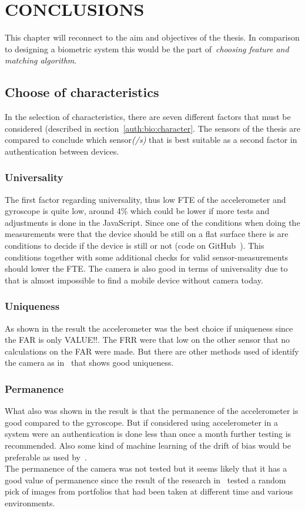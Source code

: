 \chapter{CONCLUSIONS}\label{cha:conculsions}
This chapter will reconnect to the aim and objectives of the thesis. In comparison to designing a biometric system this would be the part of~\textit{choosing feature and matching algorithm}.

\section{Choose of characteristics}\label{sec:concl:choose}
In the selection of characteristics, there are seven different factors that must be considered (described in section~\ref{auth:bio:character}. The sensors of the thesis are compared to conclude which sensor\textit{(/s)} that is best suitable as a second factor in authentication between devices.

\subsection*{Universality}
The first factor regarding universality, thus low FTE of the accelerometer and gyroscope is quite low, around 4\% which could be lower if more tests and adjustments is done in the JavaScript. Since one of the conditions when doing the measurements were that the device should be still on a flat surface there is are conditions to decide if the device is still or not (code on GitHub~\cite[]{sensorrec}). This conditions together with some additional checks for valid sensor-measurements should lower the FTE.  The camera is also good in terms of universality due to that is almost impossible to find a mobile device without camera today.\\

\subsection*{Uniqueness}
As shown in the result the accelerometer was the best choice if uniqueness since the FAR is only VALUE!!. The FRR were that low on the other sensor that no calculations on the FAR were made. But there are other methods used of identify the camera as in~\cite{sensor:camera:blind} that shows good uniqueness.

\subsection*{Permanence}
What also was shown in the result is that the permanence of the accelerometer is good compared to the gyroscope. But if considered using accelerometer in a system were an authentication is done less than once a month further testing is recommended. Also some kind of machine learning of the drift of bias would be preferable as used by~\cite{sensor:accelPrint}. \\
The permanence of the camera was not tested but it seems likely that it has a good value of permanence since the result of the research in~\cite{sensor:camera:DCIdent} tested a random pick of images from portfolios that had been taken at different time and various environments. 

